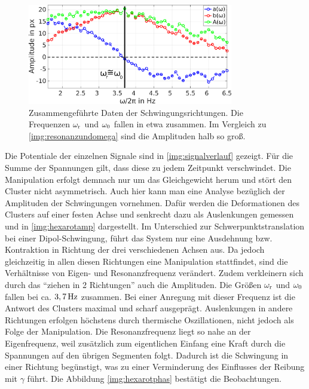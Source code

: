           \begin{figure}[!b]
            \centering
            \includegraphics[width=0.8\textwidth,height=0.37\textwidth]{figs/auswertung/phasen/rotphasenaufg.png}
            \caption{Zusammengeführte Daten der Schwingungsrichtungen. Die Frequenzen $\omega_\text{r}$ und $\omega_\text{0}$ fallen in etwa zusammen. Im Vergleich zu \autoref{img:resonanzundomega} sind die Amplituden halb so groß.}\label{img:hexarotphas}
          \end{figure}

          Die Potentiale der einzelnen Signale sind in \autoref{img:signalverlauf} gezeigt. Für die Summe der Spannungen gilt, dass diese zu jedem Zeitpunkt verschwindet. Die Manipulation erfolgt demnach nur um das Gleichgewicht herum und stört den Cluster nicht asymmetrisch. Auch hier kann man eine Analyse bezüglich der Amplituden der Schwingungen vornehmen. Dafür werden die Deformationen des Clusters auf einer festen Achse und senkrecht dazu als Auslenkungen gemessen und in \autoref{img:hexarotamp} dargestellt. Im Unterschied zur Schwerpunktstranslation bei einer Dipol-Schwingung, führt das System nur eine Ausdehnung bzw. Kontraktion in Richtung der drei verschiedenen Achsen aus. Da jedoch gleichzeitig in allen diesen Richtungen eine Manipulation stattfindet, sind die Verhältnisse von Eigen- und Resonanzfrequenz verändert. Zudem verkleinern sich durch das "`ziehen in 2 Richtungen"' auch die Amplituden. Die Größen $\omega_\text{r}$ und $\omega_\text{0}$ fallen bei ca. $\unit[3,7]{Hz}$ zusammen. Bei einer Anregung mit dieser Frequenz ist die Antwort des Clusters maximal und scharf ausgeprägt. Auslenkungen in andere Richtungen erfolgen höchstens durch thermische Oszillationen, nicht jedoch als Folge der Manipulation. Die Resonanzfrequenz liegt so nahe an der Eigenfrequenz, weil zusätzlich zum eigentlichen Einfang eine Kraft durch die Spannungen auf den übrigen Segmenten folgt. Dadurch ist die Schwingung in einer Richtung begünstigt, was zu einer Verminderung des Einflusses der Reibung mit $\gamma$ führt. Die Abbildung \autoref{img:hexarotphas} bestätigt die Beobachtungen.

